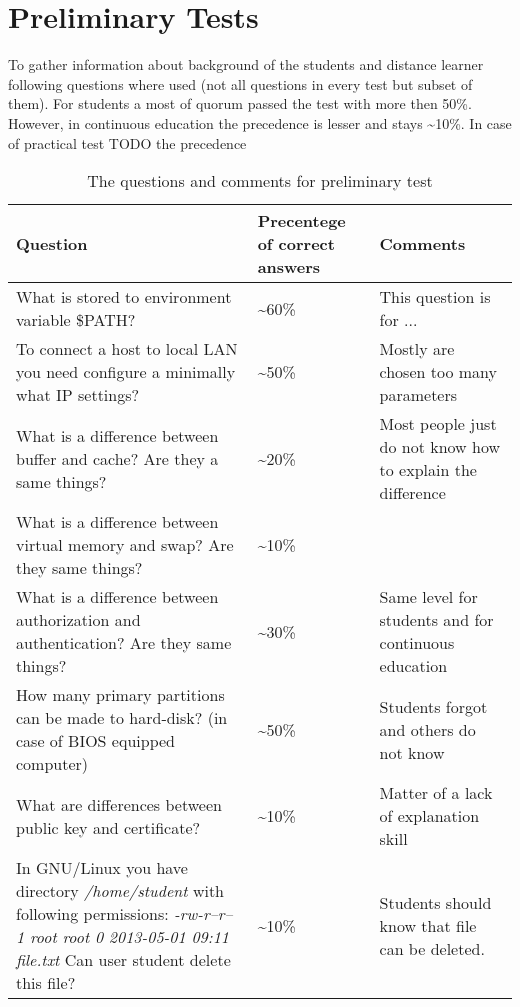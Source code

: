 \chapter{Preliminary Tests}
\label{Preliminary Tests}

To gather information about background of the students and distance learner following questions where used (not all questions in every test but subset of them). For students a most of quorum passed the test with more then 50\%. However, in continuous education the precedence is lesser and stays \textasciitilde 10\%. In case of practical test TODO the precedence 

\begin{table}[h]
\centering
\caption{The questions and comments for preliminary test}

\begin{tabular}{|p{7cm}|p{2cm}|p{5cm}|}
\hline 
\color{blue}
Question & \color{blue} Precentege of correct answers & \color{blue} Comments \\ 
\hline 
What is stored to environment variable \$PATH? & \textasciitilde 60\% & This question is for ...\\ 
\hline 
To connect a host to local LAN you need configure a minimally what IP settings? & \textasciitilde 50\% & Mostly are chosen too many parameters\\ 
\hline 
What is a difference between buffer and cache? Are they a same things? &\textasciitilde 20\% & Most people just do not know how to explain the difference  \\ 
\hline 
What is a difference between virtual memory and swap? Are they same things? & \textasciitilde 10\%  &   \\ 
\hline 
What is a difference between authorization and authentication? Are they same things? & \textasciitilde 30\% & Same level for students and  for continuous education \\ 
\hline 
How many primary partitions can be made to hard-disk? (in case of BIOS equipped computer) & \textasciitilde 50\% & Students forgot and others do not know  \\ 
\hline 
What are differences between public key and certificate?  & \textasciitilde 10\% & Matter of a lack of explanation skill \\ 
\hline 
In \gls{GNU/Linux} you have directory \emph{/home/student} with following permissions: 
 \emph{-rw-r--r-- 1 root root 0 2013-05-01 09:11 file.txt}
Can user student delete this file? &  \textasciitilde 10\% &Students should know that file can be deleted.  \\ 
\hline 
\end{tabular} 

\label{tab:preliminary_test}
\end{table}

